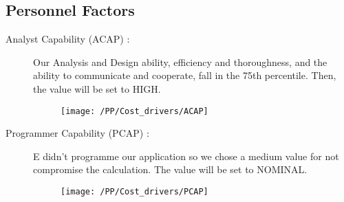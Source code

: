 \subsection{Personnel Factors}
\begin{description}
    \item [Analyst Capability (ACAP) :] Our Analysis and Design ability, efficiency and thoroughness, and the ability to communicate and cooperate, fall in the 75th percentile. Then, the value will be set to HIGH.
    \begin{figure}[!ht]
      \centering
      \vspace{0.2cm}
      \texttt{[image: /PP/Cost\_drivers/ACAP]}\\
      \vspace{0.2cm}
      \label{fig:ACAP} 
    \end{figure}   
    \item [Programmer Capability (PCAP) :] E didn't programme our application so we chose a medium value for not compromise the calculation. The value will be set to NOMINAL.
    \begin{figure}[!ht]
      \centering
      \vspace{0.2cm}
      \texttt{[image: /PP/Cost\_drivers/PCAP]}\\
      \vspace{0.2cm}
      \label{fig:PCAP} 
    \end{figure}   


\end{description}
